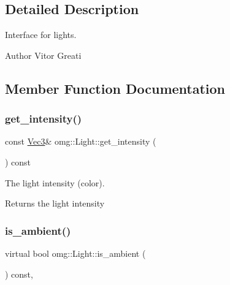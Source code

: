 \subsection{Detailed Description}
Interface for lights. 

\begin{DoxyAuthor}{Author}
Vitor Greati 
\end{DoxyAuthor}


\subsection{Member Function Documentation}
\mbox{\label{classomg_1_1_light_a7be0cc4d0e3b3c8167ec50706abfd39b}} 
\subsubsection{\texorpdfstring{get\_intensity()}{get\_intensity()}}
{\footnotesize\ttfamily const \mbox{\hyperlink{namespaceomg_a45a9482677fee9933ff369b49894e316}{Vec3}}\& omg\+::\+Light\+::get\+\_\+intensity (\begin{DoxyParamCaption}{ }\end{DoxyParamCaption}) const\hspace{0.3cm}{\ttfamily [inline]}}



The light intensity (color). 

\begin{DoxyReturn}{Returns}
the light intensity 
\end{DoxyReturn}
\mbox{\label{classomg_1_1_light_a25277f4ac404857b8895e64f28c7cb13}} 
\subsubsection{\texorpdfstring{is\_ambient()}{is\_ambient()}}
{\footnotesize\ttfamily virtual bool omg\+::\+Light\+::is\+\_\+ambient (\begin{DoxyParamCaption}{ }\end{DoxyParamCaption}) const\hspace{0.3cm}{\ttfamily [inline]}, {\ttfamily [virtual]}}



